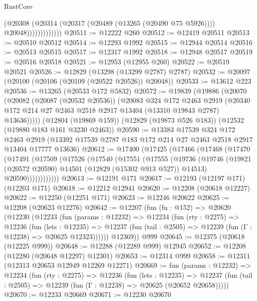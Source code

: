\begin{lexlean}{RustCore}
\begin{coremodule}
                          (@20308
                            (@20314
                              (@20317 (@20489 (@13265 (@20490 @75 @5926))))
                              @20048)))))))))))))
@20511 := @12222 @260
@20512 := @12419 @20511
@20513 := @20510 @20512
@20514 := @12293 @1992
@20515 := @12944 @20514
@20516 := @20513 @20515
@20517 := @12317 @1992
@20518 := @12948 @20517
@20519 := @20516 @20518
@20521 := @12953 (@12955 @260)
@20522 := @20519 @20521
@20526 := @12829 (@13298 (@13299 @2787) @2787)
@20532 := @20097 (@20100 (@20106 (@20109 (@20522 @20526)) @20048))
@20533 := @13612 @223
@20536 := @13265 (@20533 @172 @5832)
@20572 := @19839
    (@19886
      (@20070
        (@20082
          (@20087 (@20532 @20536))
          (@20083
            @324
            @172
            @2463
            @2919
            (@20340 @172 @214 @27 @2463 @2518 @2917 @13404 (@13310 @19843 @2787) @13636)))))
    (@12804 (@19869 @159))
    (@12829 (@19873 @526 @183))
    (@12532 (@19880 @183 @161 @3230 @2463))
@20590 := @13383
    @17539
    @324
    @172
    @2463
    @2919
    (@13392 @17539 @2787 @183 @172 @214 @27 @2463 @2518 @2917 @13404 @17777 @13636)
@20612 := @17400
    (@17425
      (@17466
        (@17468
          (@17470
            (@17491
              (@17509
                (@17526
                  (@17540
                    (@17551
                      (@17555
                        (@19736
                          (@19746
                            (@19821 (@20572 @20590) @14501 (@12829 (@15302 @913 @527)) @14513)
                            @20590))))))))))))
@20613 := @12191 @171
@20617 := @12193 (@12197 @171) (@12203 @171)
@20618 := @12212 @12941
@20620 := @12208 (@20618 @12227)
@20622 := @12250 (@12251 @171)
@20623 := @12246 @20622
@20625 := @12208 (@20623 @12276)
@20642 := @12207
    (fun (fn : @152) =>
    @20620
      (@12230
        (@12233
          (fun (params : @12232) =>
          @12234
            (fun (rty : @2275) =>
            @12236
              (fun (lets : @12235) =>
              @12237 (fun (tail : @2505) => @12239 (fun (Γ : @12238) => @20625 @12323))))))
        @12369))
    @999
@20645 := @12375 (@20618 (@12225 @999))
@20648 := @12288 (@12289 @999) @12945
@20652 := @12208 (@12280 (@20648 @12297) @12301)
@20653 := @12314 @999
@20658 := @12311 (@12313 @20653 @12949 @12269 @12271)
@20669 := fun (params : @12232) =>
  @12234
    (fun (rty : @2275) =>
    @12236
      (fun (lets : @12235) =>
      @12237 (fun (tail : @2505) => @12239 (fun (Γ : @12238) => @20625 (@20652 @20658)))))
@20670 := @12233 @20669
@20671 := @12230 @20670

\end{coremodule}
\end{lexlean}
